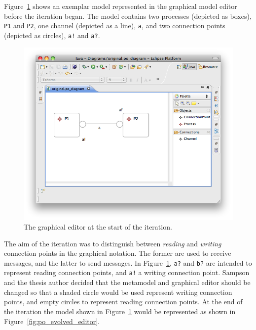 Figure~\ref{fig:po_original_editor} shows an exemplar model represented in the graphical model editor before the iteration began. The model contains two processes (depicted as boxes), \texttt{P1} and \texttt{P2}, one channel (depicted as a line), \texttt{a}, and two connection points (depicted as circles), \texttt{a!} and \texttt{a?}.

\begin{figure}[htbp]
	\centering
	\includegraphics[width=13.5cm]{6.Evaluation/images/user_driven/po_original_editor.png}
	\caption{The graphical editor at the start of the iteration.}
	\label{fig:po_original_editor}
\end{figure}


The aim of the iteration was to distinguish between \emph{reading} and \emph{writing} connection points in the graphical notation. The former are used to receive messages, and the latter to send messages. In Figure~\ref{fig:po_original_editor}, \texttt{a?} and \texttt{b?} are intended to represent reading connection points, and \texttt{a!} a writing connection point. Sampson and the thesis author decided that the metamodel and graphical editor should be changed so that a shaded circle would be used represent writing connection points, and empty circles to represent reading connection points. At the end of the iteration the model shown in Figure~\ref{fig:po_original_editor} would be represented as shown in Figure~\ref{fig:po_evolved_editor}.

